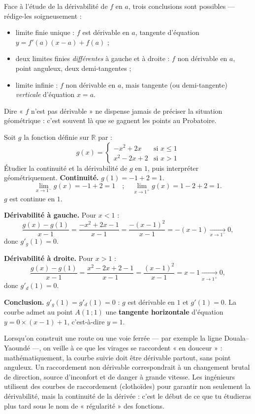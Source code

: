 \documentclass[11pt]{article}
\begin{document}
\begin{attention}
Face à l'étude de la dérivabilité de $f$ en $a$, trois conclusions sont possibles — rédige-les soigneusement :
\begin{itemize}
\item limite finie unique : $f$ est dérivable en $a$, tangente d'équation $y = f'(a)(x-a)+f(a)$ ;
\item deux limites finies \emph{différentes} à gauche et à droite : $f$ non dérivable en $a$, point anguleux, deux demi-tangentes ;
\item limite infinie : $f$ non dérivable en $a$, mais tangente (ou demi-tangente) \emph{verticale} d'équation $x = a$.
\end{itemize}
Dire « $f$ n'est pas dérivable » ne dispense jamais de préciser la situation géométrique : c'est souvent là que se gagnent les points au Probatoire.
\end{attention}

\begin{exoresolu}
Soit $g$ la fonction définie sur $\mathbb{R}$ par :
\[ g(x) = \begin{cases} -x^{2} + 2x & \text{si } x \leq 1 \\ x^{2} - 2x + 2 & \text{si } x > 1 \end{cases} \]
Étudier la continuité et la dérivabilité de $g$ en $1$, puis interpréter géométriquement.
\tcblower
\textbf{Continuité.} $g(1) = -1 + 2 = 1$.
\[ \lim_{x \to 1^{-}} g(x) = -1 + 2 = 1 \quad ; \quad \lim_{x \to 1^{+}} g(x) = 1 - 2 + 2 = 1. \]
$g$ est continue en $1$.

\textbf{Dérivabilité à gauche.} Pour $x < 1$ :
\[ \frac{g(x)-g(1)}{x-1} = \frac{-x^{2}+2x-1}{x-1} = \frac{-(x-1)^{2}}{x-1} = -(x-1) \xrightarrow[x \to 1^{-}]{} 0, \]
donc $g'_{g}(1) = 0$.

\textbf{Dérivabilité à droite.} Pour $x > 1$ :
\[ \frac{g(x)-g(1)}{x-1} = \frac{x^{2}-2x+2-1}{x-1} = \frac{(x-1)^{2}}{x-1} = x-1 \xrightarrow[x \to 1^{+}]{} 0, \]
donc $g'_{d}(1) = 0$.

\textbf{Conclusion.} $g'_{g}(1) = g'_{d}(1) = 0$ : $g$ est dérivable en $1$ et $g'(1) = 0$. La courbe admet au point $A(1\,;1)$ une \textbf{tangente horizontale} d'équation $y = 0 \times (x-1) + 1$, c'est-à-dire $y = 1$.
\end{exoresolu}

\begin{savaistu}
Lorsqu'on construit une route ou une voie ferrée — par exemple la ligne Douala--Yaoundé —, on veille à ce que les virages se raccordent « en douceur » : mathématiquement, la courbe suivie doit être dérivable partout, sans point anguleux. Un raccordement non dérivable correspondrait à un changement brutal de direction, source d'inconfort et de danger à grande vitesse. Les ingénieurs utilisent des courbes de raccordement (clothoïdes) pour garantir non seulement la dérivabilité, mais la continuité de la dérivée : c'est le début de ce que tu étudieras plus tard sous le nom de « régularité » des fonctions.
\end{savaistu}
\end{document}

